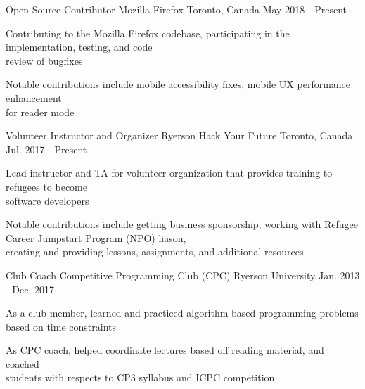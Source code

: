 \begin{cventries}
    \cventry
    {Open Source Contributor}
    {Mozilla Firefox}
    {Toronto, Canada}
    {May 2018 - Present}
    {
      \begin{cvitems}
        \item {Contributing to the Mozilla Firefox codebase, participating in the implementation, testing, and code \\review of bugfixes}
        \item {Notable contributions include mobile accessibility fixes, mobile UX performance enhancement \\for reader mode}
      \end{cvitems}
    }
     \cventry
    {Volunteer Instructor and Organizer}
    {Ryerson Hack Your Future}
    {Toronto, Canada}
    {Jul. 2017 - Present}
    {
      \begin{cvitems}
        \item {Lead instructor and TA for volunteer organization that provides training to refugees to become \\ software developers}
        \item {Notable contributions include getting business sponsorship, working with Refugee Career Jumpstart Program (NPO) liason, \\creating and providing lessons, assignments, and additional resources}
      \end{cvitems}
    }
   \cventry
    {Club Coach}
    {Competitive Programming Club (CPC)}
    {Ryerson University}
    {Jan. 2013 - Dec. 2017}
    {
      \begin{cvitems}
        \item {As a club member, learned and practiced algorithm-based programming problems based on time constraints}
        \item {As CPC coach, helped coordinate lectures based off reading material, and coached \\students with respects to CP3 syllabus and ICPC competition}
      \end{cvitems}
    }

\end{cventries}
